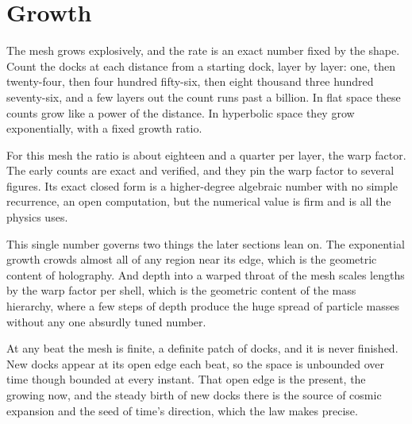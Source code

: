 \section{Growth}

The mesh grows explosively, and the rate is an exact number fixed by the shape. Count the docks at each distance from a starting dock, layer by layer: one, then twenty-four, then four hundred fifty-six, then eight thousand three hundred seventy-six, and a few layers out the count runs past a billion. In flat space these counts grow like a power of the distance. In hyperbolic space they grow exponentially, with a fixed growth ratio.

For this mesh the ratio is about eighteen and a quarter per layer, the warp factor. The early counts are exact and verified, and they pin the warp factor to several figures. Its exact closed form is a higher-degree algebraic number with no simple recurrence, an open computation, but the numerical value is firm and is all the physics uses.

This single number governs two things the later sections lean on. The exponential growth crowds almost all of any region near its edge, which is the geometric content of holography. And depth into a warped throat of the mesh scales lengths by the warp factor per shell, which is the geometric content of the mass hierarchy, where a few steps of depth produce the huge spread of particle masses without any one absurdly tuned number.

At any beat the mesh is finite, a definite patch of docks, and it is never finished. New docks appear at its open edge each beat, so the space is unbounded over time though bounded at every instant. That open edge is the present, the growing now, and the steady birth of new docks there is the source of cosmic expansion and the seed of time's direction, which the law makes precise.
